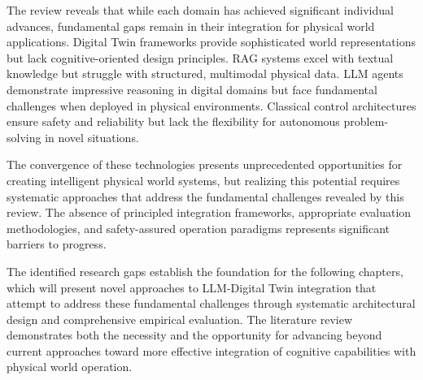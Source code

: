 The review reveals that while each domain has achieved significant individual advances, fundamental gaps remain in their integration for physical world applications. Digital Twin frameworks provide sophisticated world representations but lack cognitive-oriented design principles. RAG systems excel with textual knowledge but struggle with structured, multimodal physical data. LLM agents demonstrate impressive reasoning in digital domains but face fundamental challenges when deployed in physical environments. Classical control architectures ensure safety and reliability but lack the flexibility for autonomous problem-solving in novel situations.

The convergence of these technologies presents unprecedented opportunities for creating intelligent physical world systems, but realizing this potential requires systematic approaches that address the fundamental challenges revealed by this review. The absence of principled integration frameworks, appropriate evaluation methodologies, and safety-assured operation paradigms represents significant barriers to progress.

The identified research gaps establish the foundation for the following chapters, which will present novel approaches to LLM-Digital Twin integration that attempt to address these fundamental challenges through systematic architectural design and comprehensive empirical evaluation. The literature review demonstrates both the necessity and the opportunity for advancing beyond current approaches toward more effective integration of cognitive capabilities with physical world operation.